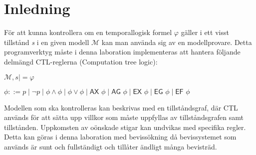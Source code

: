 \section{Inledning}
För att kunna kontrollera om en temporallogisk formel $\varphi$ gäller i ett visst tillstånd \textit{s} i en given modell $\mathcal{M}$ kan man använda sig
av en modellprovare. Detta programverktyg måste i denna laboration implementeras att hantera följande delmängd CTL-reglerna (Computation tree
logic):

\begin{center}

$\mathcal{M} , s \mid = \varphi$

$\phi ::= p \mid \neg p \mid \phi \wedge \phi \mid \phi \vee \phi \mid \textsf{AX } \phi \mid \textsf{AG } \phi \mid \textsf{EX } \phi \mid \textsf{EG } \phi \mid \textsf{EF } \phi $

\end{center}

Modellen som ska kontrolleras kan beskrivas med en tillståndsgraf, där CTL används för att sätta upp villkor som måste uppfyllas av tillståndsgrafen samt tillstånden. Uppkomsten av oönskade stigar kan undvikas med specifika regler. Detta kan göras i denna laboration med bevissökning då bevissystemet som används är sunt och fullständigt och tillåter ändligt många bevisträd.